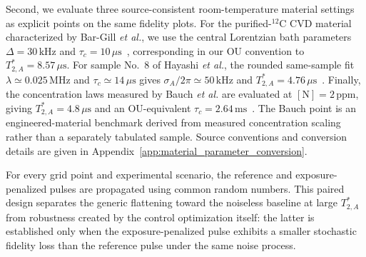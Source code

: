 \documentclass[
  aps,
  pra,
  reprint,            %
  superscriptaddress, %
  amsmath,amssymb,
  notitlepage
]{revtex4-2}
\begin{document}
Second, we evaluate three source-consistent room-temperature material settings as explicit points on the same fidelity plots. For the purified-$^{12}\mathrm C$ CVD material characterized by Bar-Gill \emph{et al.}, we use the central Lorentzian bath parameters $\Delta=30\,\mathrm{kHz}$ and $\tau_c=10\,\mu\mathrm{s}$~\cite{bargill2012spectroscopy}, corresponding in our OU convention to $T_{2,A}^{\ast}=8.57\,\mu\mathrm{s}$. For sample No.~8 of Hayashi \emph{et al.}, the rounded same-sample fit $\lambda\simeq0.025\,\mathrm{MHz}$ and $\tau_c\simeq14\,\mu\mathrm{s}$ gives $\sigma_A/2\pi\simeq50\,\mathrm{kHz}$ and $T_{2,A}^{\ast}=4.76\,\mu\mathrm{s}$~\cite{hayashi2020noise}. Finally, the concentration laws measured by Bauch \emph{et al.} are evaluated at $[\mathrm N]=2\,\mathrm{ppm}$, giving $T_{2,A}^{\ast}=4.8\,\mu\mathrm{s}$ and an OU-equivalent $\tau_c=2.64\,\mathrm{ms}$~\cite{bauch2020decoherence}. The Bauch point is an engineered-material benchmark derived from measured concentration scaling rather than a separately tabulated sample. Source conventions and conversion details are given in Appendix~\ref{app:material_parameter_conversion}.

For every grid point and experimental scenario, the reference and exposure-penalized pulses are propagated using common random numbers. This paired design separates the generic flattening toward the noiseless baseline at large $T_{2,A}^{\ast}$ from robustness created by the control optimization itself: the latter is established only when the exposure-penalized pulse exhibits a smaller stochastic fidelity loss than the reference pulse under the same noise process.
\end{document}
